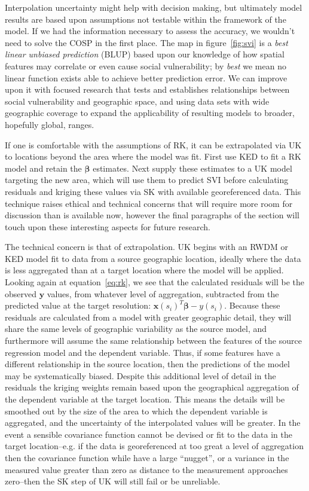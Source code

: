Interpolation uncertainty might help with decision making, but ultimately model results are based upon assumptions not testable within the framework of the model.  If we had the information necessary to assess the accuracy, we wouldn't need to solve the COSP in the first place.  The map in figure~\ref{fig:svi} is a {\em best linear unbiased prediction} (BLUP) based upon our knowledge of how spatial features may correlate or even cause social vulnerability; by {\em best} we mean no linear function exists able to achieve better prediction error.  We can improve upon it with focused research that tests and establishes relationships between social vulnerability and geographic space, and using data sets with wide geographic coverage to expand the applicability of resulting models to broader, hopefully global, ranges.

If one is comfortable with the assumptions of RK, it can be extrapolated via UK to locations beyond the area where the model was fit.  First use KED to fit a RK model and retain the $\bm{\beta}$ estimates.  Next supply these estimates to a UK model targeting the new area, which will use them to predict SVI before calculating residuals and kriging these values via SK with available georeferenced data.  This technique raises ethical and technical concerns that will require more room for discussion than is available now, however the final paragraphs of the section will touch upon these interesting aspects for future research.

The technical concern is that of extrapolation.  UK begins with an RWDM or KED model fit to data from a source geographic location, ideally where the data is less aggregated than at a target location where the model will be applied.  Looking again at equation~\ref{eq:rk}, we see that the calculated residuals will be the observed $\bm{y}$ values, from whatever level of aggregation, subtracted from the predicted value at the target resolution: $\bm{x}(s_i)^T \bm{\beta} - y(s_i)$.  Because these residuals are calculated from a model with greater geographic detail, they will share the same levels of geographic variability as the source model, and furthermore will assume the same relationship between the features of the source regression model and the dependent variable.  Thus, if some features have a different relationship in the source location, then the predictions of the model may be systematically biased.  Despite this additional level of detail in the residuals the kriging weights remain based upon the geographical aggregation of the dependent variable at the target location.  This means the details will be smoothed out by the size of the area to which the dependent variable is aggregated, and the uncertainty of the interpolated values will be greater.  In the event a sensible covariance function cannot be devised or fit to the data in the target location--e.g. if the data is georeferenced at too great a level of aggregation then the covariance function while have a large ``nugget'', or a variance in the measured value greater than zero as distance to the measurement approaches zero--then the SK step of UK will still fail or be unreliable.


